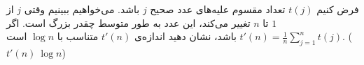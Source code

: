 \EXERCISE
فرض کنیم
$t(j)$
تعداد مقسوم علیه‌های عدد صحیح
$j$
باشد. می‌خواهیم ببینیم وقتی
$j$
از
$1$
تا
$n$
تغییر می‌کند، این عدد به طور متوسط چقدر بزرگ است. اگر
$t'(n) = \frac{1}{n} \sum_{j=1}^{n} t(j)$
باشد، نشان دهید اندازه‌ی
$t'(n)$
متناسب با
$\log n$
است.
($t'(n) ~ \log n$)